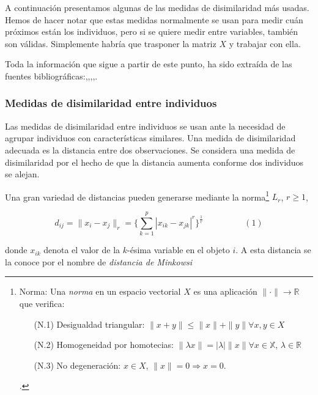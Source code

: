 A continuación presentamos algunas de las medidas de disimilaridad más usadas. Hemos de hacer notar que estas medidas normalmente se usan para medir cuán próximos están los individuos, 
pero si se quiere medir entre variables, también son válidas. Simplemente habría que trasponer la matriz $X$ y trabajar con ella. \newline

Toda la información que sigue a partir de este punto, ha sido extraída de las fuentes bibliográficas:\cite{clustering-1},\cite{clustering-2},\cite{Bib-1},\cite{Bib-5},\cite{Bib-6}.

\subsubsection{Medidas de disimilaridad entre individuos}   %

Las medidas de disimilaridad entre individuos se usan ante la necesidad de agrupar individuos con características similares. Una medida de disimilaridad adecuada es la distancia entre 
dos observaciones. Se considera una medida de disimilaridad por el hecho de que la distancia aumenta conforme dos individuos se alejan. \newline

Una gran variedad de distancias pueden generarse mediante la norma\footnote[10]{Norma: Una \textit{norma} en un espacio vectorial $X$ es una aplicación $\|\cdot\| \rightarrow \mathbb{R}$ que verifica:
\begin{itemize}
    \item[(N.1)] Desigualdad triangular: $\|x+y\| \leq \|x\| + \|y\| \forall x,y \in X$
    \item[(N.2)] Homogeneidad por homotecias: $\|\lambda x\| = |\lambda| \|x\| \forall x \in \mathbb{X}$, $\lambda \in \mathbb{R}$
    \item[(N.3)] No degeneración: $x \in X$, $\|x\| = 0 \Rightarrow x = 0$.\cite{def-norma}  
\end{itemize}.} $L_{r}$, $r \geq 1$, 


\[
d_{ij} = \|x_{i} - x_{j}\|_{r} = \{\sum_{k=1}^{p} |x_{ik}-x_{jk}|^{r}\}^{\frac{1}{r}} \hspace{2cm} (1)
\]

donde $x_{ik}$ denota el valor de la $k$-ésima variable en el objeto $i$. A esta distancia se la conoce por el nombre de \textit{distancia de Minkowsi}\newline

